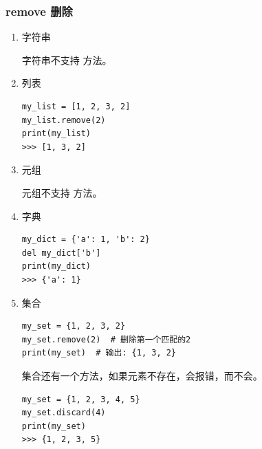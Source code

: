 \subsubsection{remove 删除}
\begin{enumerate}[label=\arabic*)]
    \item 字符串

    字符串不支持  方法。

    \item 列表

\begin{lstlisting}[style=demostyle,numbers=none]
my_list = [1, 2, 3, 2]
my_list.remove(2)
print(my_list)  
>>> [1, 3, 2]
\end{lstlisting}

    \item 元组

    元组不支持  方法。

    \item 字典
\begin{lstlisting}[style=demostyle,numbers=none]
my_dict = {'a': 1, 'b': 2}
del my_dict['b']
print(my_dict)
>>> {'a': 1}
\end{lstlisting}

    \item 集合
\begin{lstlisting}[style=demostyle,numbers=none]
my_set = {1, 2, 3, 2}
my_set.remove(2)  # 删除第一个匹配的2
print(my_set)  # 输出: {1, 3, 2}
\end{lstlisting}

    集合还有一个方法，如果元素不存在，会报错，而不会。
\begin{lstlisting}[style=demostyle,numbers=none]
my_set = {1, 2, 3, 4, 5}
my_set.discard(4)
print(my_set)
>>> {1, 2, 3, 5}
\end{lstlisting}
\end{enumerate}

